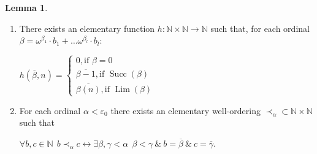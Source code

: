 \documentclass[8pt]{article}
\theoremstyle{definition}
\theoremstyle{definition}
\theoremstyle{definition}
\theoremstyle{definition}
\theoremstyle{definition}
\theoremstyle{definition}
\theoremstyle{definition}
\theoremstyle{definition}
\newtheorem{lemma}{Lemma}[section]
\theoremstyle{definition}
\theoremstyle{definition}
\theoremstyle{definition}
\theoremstyle{definition}
\theoremstyle{definition}
\theoremstyle{question}
\begin{document}
\begin{lemma}
  $ $
  \begin{enumerate}
    \item There exists an elementary function $h : \mathbb{N} \times \mathbb{N} \to \mathbb{N}$ such that, for each
    ordinal $\beta = \omega^{\beta_1} \cdot b_1 + \dots \omega^{\beta_l} \cdot b_l$:
    \begin{center}
      $h(\overline{\beta}, n) = \begin{cases}
        0, \text{if $\beta = 0$} \\
        \overline{\beta - 1}, \text{if $\operatorname{Succ}(\beta)$} \\
        \overline{\beta(n)}, \text{if $\operatorname{Lim}(\beta)$}
      \end{cases}$
    \end{center}
    \item For each ordinal $\alpha < \varepsilon_0$ there exists an elementary well-ordering 
    $\prec_{\alpha} \subset \mathbb{N} \times \mathbb{N}$ such that
    \begin{center}
      $\forall b, c \in \mathbb{N} \:\: b \prec_{\alpha} c \leftrightarrow \exists \beta, \gamma < \alpha \:\: \beta < \gamma \: \& \: b = \overline{\beta} \: \& \: c = \overline{\gamma}$.
    \end{center}
  \end{enumerate}
\end{lemma}
\end{document}
